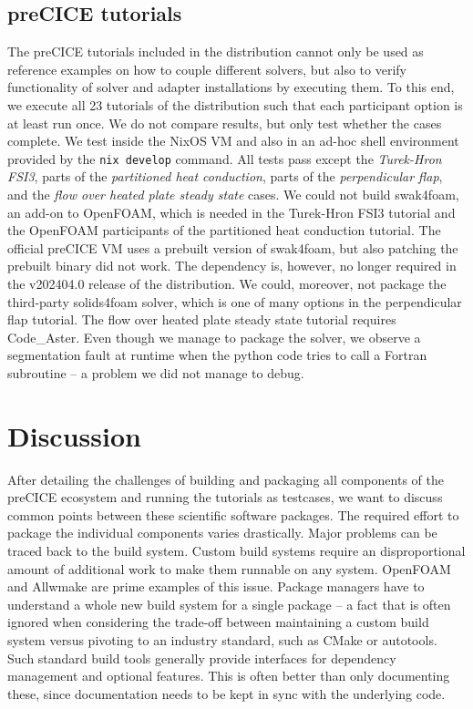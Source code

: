 \documentclass{eceasst}
\begin{document}
\subsection{preCICE tutorials}

The preCICE tutorials included in the distribution cannot only be used as reference examples on how to couple different solvers, but also to verify functionality of solver and adapter installations by executing them.
To this end, we execute all 23 tutorials of the distribution such that each participant option is at least run once. We do not compare results, but only test whether the cases complete.
We test inside the NixOS VM and also in an ad-hoc shell environment provided by the \texttt{nix develop} command. All tests pass except the \textit{Turek-Hron FSI3}, parts of the \textit{partitioned heat conduction}, parts of the \textit{perpendicular flap}, and the \textit{flow over heated plate steady state} cases.
We could not build swak4foam, an add-on to OpenFOAM, which is needed in the Turek-Hron FSI3 tutorial and the OpenFOAM participants of the partitioned heat conduction tutorial.
The official preCICE VM uses a prebuilt version of swak4foam, but also patching the prebuilt binary did not work.
The dependency is, however, no longer required in the v202404.0 release of the distribution.
We could, moreover, not package the third-party solids4foam solver, which is one of many options in the perpendicular flap tutorial. 
The flow over heated plate steady state tutorial requires Code\_Aster. Even though we manage to package the solver, we observe a segmentation fault at runtime when the python code tries to call a Fortran subroutine -- a problem we did not manage to debug.


\section{Discussion}

After detailing the challenges of building and packaging all components of the preCICE ecosystem and running the tutorials as testcases, we want to discuss common points between these scientific software packages.
The required effort to package the individual components varies drastically. Major problems can be traced back to the build system.
Custom build systems require an disproportional amount of additional work to make them runnable on any system.
OpenFOAM and Allwmake are prime examples of this issue. Package managers have to understand a whole new build system for a single package -- a fact that is often ignored when considering the trade-off between maintaining a custom build system versus pivoting to an industry standard, such as CMake or autotools.
Such standard build tools generally provide interfaces for dependency management and optional features. This is often better than only documenting these, since documentation needs to be kept in sync with the underlying code.
\end{document}
